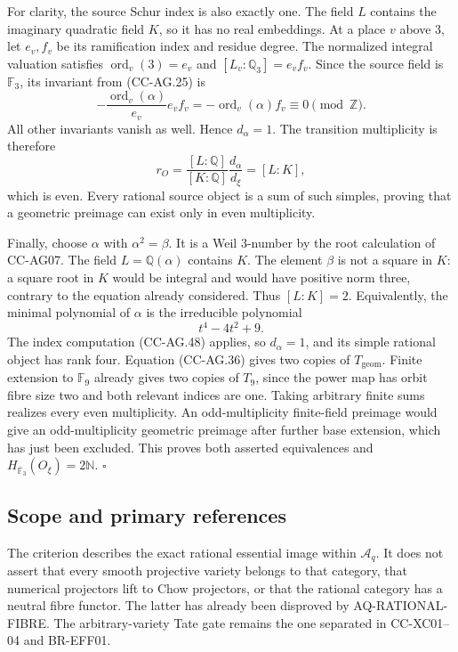 For clarity, the source Schur index is also exactly one.
The field \(L\) contains the imaginary quadratic field
\(K\), so it has no real embeddings.  At a place \(v\)
above \(3\), let \(e_v,f_v\) be its ramification index
and residue degree.  The normalized integral valuation
satisfies
\(\operatorname{ord}_v(3)=e_v\) and
\([L_v:\mathbb Q_3]=e_vf_v\).
Since the source field is \(\mathbb F_3\), its invariant
from (CC-AG.25) is
\[
        -\frac{\operatorname{ord}_v(\alpha)}{e_v}
                          e_vf_v
          =-\operatorname{ord}_v(\alpha)f_v
          \equiv0\pmod{\mathbb Z}.
                                                               \tag{CC-AG.48}
\]
All other invariants vanish as well.  Hence \(d_\alpha=1\).
The transition multiplicity is therefore
\[
        r_O=\frac{[L:\mathbb Q]}{[K:\mathbb Q]}
                              \frac{d_\alpha}{d_\xi}
             =[L:K],
                                                               \tag{CC-AG.49}
\]
which is even.  Every rational source object is a sum
of such simples, proving that a geometric preimage can
exist only in even multiplicity.

Finally, choose \(\alpha\) with \(\alpha^2=\beta\).
It is a Weil \(3\)-number by the root calculation
of CC-AG07.  The field \(L=\mathbb Q(\alpha)\)
contains \(K\).  The element \(\beta\) is not a
square in \(K\): a square root in \(K\) would be
integral and would have positive norm three, contrary
to the equation already considered.  Thus
\([L:K]=2\).  Equivalently, the minimal polynomial
of \(\alpha\) is the irreducible polynomial
\[
                              t^4-4t^2+9.
\]
The index computation (CC-AG.48) applies, so \(d_\alpha=1\),
and its simple rational object has rank four.
Equation (CC-AG.36) gives two copies of
\(T_{\mathrm{geom}}\).  Finite extension to \(\mathbb F_9\)
already gives two copies of \(T_9\), since the power map
has orbit fibre size two and both relevant indices
are one.  Taking arbitrary finite sums realizes every
even multiplicity.
An odd-multiplicity finite-field preimage would give an
odd-multiplicity geometric preimage after further base
extension, which has just been excluded.
This proves both asserted equivalences and
\(H_{\overline{\mathbb F}_3}(O_\xi)=2\mathbb N\).
\(\square\)

\subsection{Scope and primary references}

The criterion describes the exact rational essential image
within \(\mathcal A_q\).  It does not assert that every
smooth projective variety belongs to that category, that
numerical projectors lift to Chow projectors, or that the
rational category has a neutral fibre functor.  The latter
has already been disproved by AQ-RATIONAL-FIBRE.  The
arbitrary-variety Tate gate remains the one separated in
CC-XC01--04 and BR-EFF01.

